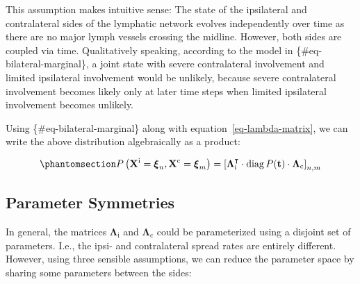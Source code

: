 \documentclass[
  sn-mathphys-num,
]{sn-jnl}
\begin{document}
This assumption makes intuitive sense: The state of the ipsilateral and
contralateral sides of the lymphatic network evolves independently over
time as there are no major lymph vessels crossing the midline. However,
both sides are coupled via time. Qualitatively speaking, according to
the model in \{\#eq-bilateral-marginal\}, a joint state with severe
contralateral involvement and limited ipsilateral involvement would be
unlikely, because severe contralateral involvement becomes likely only
at later time steps when limited ipsilateral involvement becomes
unlikely.

Using \{\#eq-bilateral-marginal\} along with
equation~\ref{eq-lambda-matrix}, we can write the above distribution
algebraically as a product:

\begin{equation}\phantomsection\label{eq-bilateral-marginal-algebra}{
P \left( \mathbf{X}^\text{i} = \boldsymbol{\xi}_n, \mathbf{X}^\text{c} = \boldsymbol{\xi}_m \right) = \left[ \boldsymbol{\Lambda}^\intercal_\text{i} \cdot \operatorname{diag} P(\mathbf{t}) \cdot \boldsymbol{\Lambda}_\text{c} \right]_{n,m}
}\end{equation}

\subsection{Parameter Symmetries}\label{sec-params-symmetry}

In general, the matrices \(\boldsymbol{\Lambda}_\text{i}\) and
\(\boldsymbol{\Lambda}_\text{c}\) could be parameterized using a
disjoint set of parameters. I.e., the ipsi- and contralateral spread
rates are entirely different. However, using three sensible assumptions,
we can reduce the parameter space by sharing some parameters between the
sides:
\end{document}

